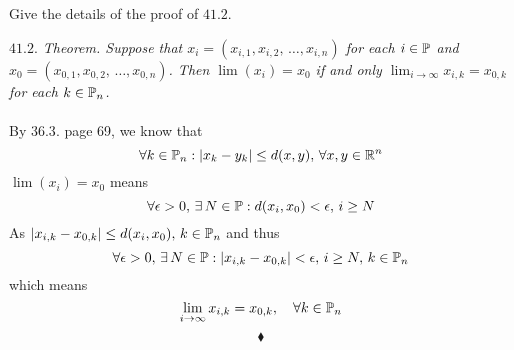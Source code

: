 \subsection{}
\begin{tcolorbox}
Give the details of the proof of $\mathbf{41.2}$.
\end{tcolorbox}
\textit{$\mathbf{41.2.}$ Theorem. Suppose that $x_i = (x_{i,1},x_{i,2},\,\dots,x_{i,n} )$ for each $i \in\mathbb{P}$ and
$x_0 = (x_{0,1},x_{0,2},\,\dots,x_{0,n})$. Then $\lim (x_i) = x_0$ if and only $\displaystyle \lim_{ i \to \infty} x_{i,k}=x_{0,k}$ for each $k\in\mathbb{P}_n$.}\\\\
By $\mathbf{36.3.}$ page 69, we know that 
$$\forall k\in\mathbb{P}_n: |x_k-y_k|\leq d(x,y),\, \forall x,y\in\mathbb{R}^n$$
$\lim (x_i) = x_0$ means
$$\forall\epsilon>0,\, \exists\, N\in\mathbb{P}: d(x_i,x_0)<\epsilon,\, i\geq N$$
As $|x_{i,k}-x_{0,k}|\leq d(x_i,x_0),\,  k\in\mathbb{P}_n$ and thus 
$$\forall\epsilon>0,\, \exists\, N\in\mathbb{P}: |x_{i,k}-x_{0,k}|<\epsilon,\, i\geq N,\, k\in\mathbb{P}_n$$
which means $$\displaystyle \lim_{ i \to \infty} x_{i,k}=x_{0,k},\quad \forall k\in\mathbb{P}_n$$
$$\blacklozenge$$\\

\newpage
